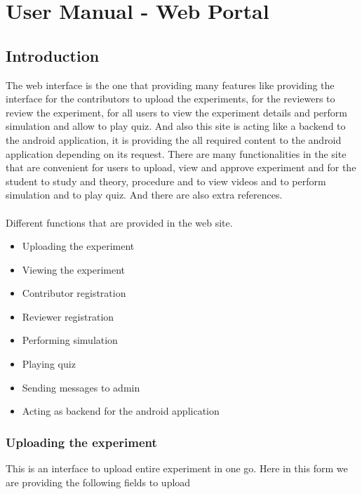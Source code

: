 \documentclass[12pt]{report}
\begin{document}
\chapter{User Manual - Web Portal}

\section{Introduction}

The web interface is the one that providing many features like providing the interface for the contributors to upload the experiments, for the reviewers to review the experiment, for all users to view the experiment details and perform simulation and allow to play quiz. And also this site is acting like a backend to the android application, it is providing the all required content to the android application depending on its request. There are many functionalities in the site that are convenient for users to upload, view and approve experiment and for the student to study and theory, procedure and to view videos and to perform simulation and to play quiz. And there are also extra references.\\
\\
Different functions that are provided in the web site.

\begin{itemize}
\item Uploading the experiment
\item Viewing the experiment
\item Contributor registration 
\item Reviewer registration
\item Performing simulation
\item Playing quiz
\item Sending messages to admin
\item Acting as backend for the android application
\end{itemize}


\subsection{Uploading the experiment}

This is an interface to upload entire experiment in one go.
Here in this form we are providing the following fields to upload
\end{document}
